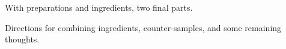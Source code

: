 \begin{note}
  With preparations and ingredients, two final parts.

  \begin{TOCEnum}
  \item

    Directions for combining ingredients, counter-samples, and some remaining thoughts.
  \end{TOCEnum}
\end{note}

